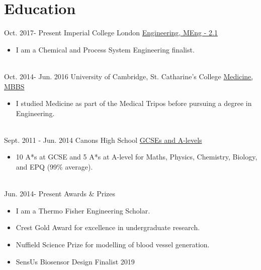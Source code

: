 \documentclass[letterpaper]{twentysecondcv} %
\begin{document}
\makeprofile %


\section{Education}
\begin{twenty} %
\twentyitem
    	{Oct. 2017-}
		{Present}
        {Imperial College London}
        {\href{http://www.imperial.ac.uk}{Engineering, MEng - 2.1}}
        {}
        {\begin{itemize}
            \item I am a Chemical and Process System Engineering finalist. 
        \end{itemize}%
        }
        \\
       
\twentyitem
    	{Oct. 2014-}
		{Jun. 2016}
        {University of Cambridge, St. Catharine's College}
        {\href{http://www.cam.ac.uk}{Medicine, MBBS}}
        {}
        {\begin{itemize}
            \item I studied Medicine as part of the Medical Tripos before pursuing a degree in Engineering.
        \end{itemize}
        }
        \\
\twentyitem
    	{Sept. 2011 -}
		{Jun. 2014}
        {Canons High School}
        {\href{http://www.canons.harrow.sch.uk}{GCSEs and A-levels}}
        {}
        {\begin{itemize}
            \item 10 A*s at GCSE and 5 A*s at A-level for Maths, Physics, Chemistry, Biology, and EPQ (99\% average).
        \end{itemize}
        }
        \\
\twentyitem
        {Jun. 2014-}
        {Present}
        {Awards \& Prizes}
        {}
        {}
        {\begin{itemize}
            \item I am a Thermo Fisher Engineering Scholar. 
            \item Crest Gold Award for excellence in undergraduate research.
            \item Nuffield Science  Prize for modelling of blood vessel generation.
            \item SensUs Biosensor Design Finalist 2019 
        \end{itemize}
        }
\end{twenty}
\end{document}
